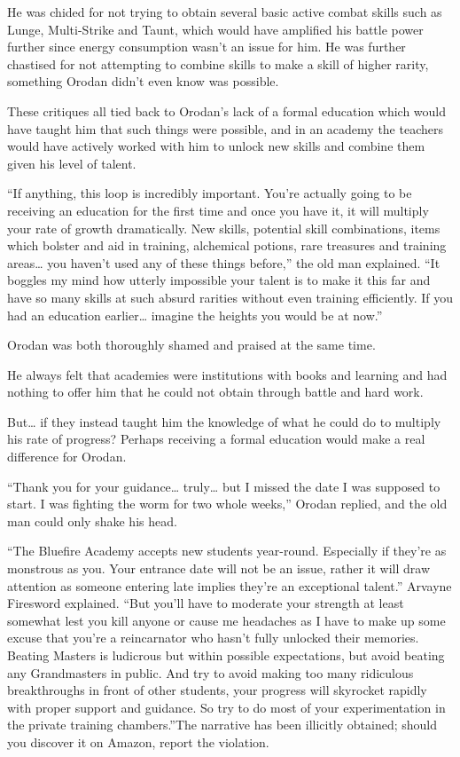 \documentclass[a4paper,10pt]{book}
\begin{document}
He was chided for not trying to obtain several basic active combat skills such as Lunge, Multi-Strike and Taunt, which would have amplified his battle power further since energy consumption wasn’t an issue for him. He was further chastised for not attempting to combine skills to make a skill of higher rarity, something Orodan didn’t even know was possible.\par
These critiques all tied back to Orodan’s lack of a formal education which would have taught him that such things were possible, and in an academy the teachers would have actively worked with him to unlock new skills and combine them given his level of talent.\par
“If anything, this loop is incredibly important. You’re actually going to be receiving an education for the first time and once you have it, it will multiply your rate of growth dramatically. New skills, potential skill combinations, items which bolster and aid in training, alchemical potions, rare treasures and training areas… you haven’t used any of these things before,” the old man explained. “It boggles my mind how utterly impossible your talent is to make it this far and have so many skills at such absurd rarities without even training efficiently. If you had an education earlier… imagine the heights you would be at now.”\par
Orodan was both thoroughly shamed and praised at the same time.\par
He always felt that academies were institutions with books and learning and had nothing to offer him that he could not obtain through battle and hard work.\par
But… if they instead taught him the knowledge of what he could do to multiply his rate of progress? Perhaps receiving a formal education would make a real difference for Orodan.\par
“Thank you for your guidance… truly… but I missed the date I was supposed to start. I was fighting the worm for two whole weeks,” Orodan replied, and the old man could only shake his head.\par
“The Bluefire Academy accepts new students year-round. Especially if they’re as monstrous as you. Your entrance date will not be an issue, rather it will draw attention as someone entering late implies they’re an exceptional talent.” Arvayne Firesword explained. “But you’ll have to moderate your strength at least somewhat lest you kill anyone or cause me headaches as I have to make up some excuse that you’re a reincarnator who hasn’t fully unlocked their memories. Beating Masters is ludicrous but within possible expectations, but avoid beating any Grandmasters in public. And try to avoid making too many ridiculous breakthroughs in front of other students, your progress will skyrocket rapidly with proper support and guidance. So try to do most of your experimentation in the private training chambers.”The narrative has been illicitly obtained; should you discover it on Amazon, report the violation.\par
\end{document}
